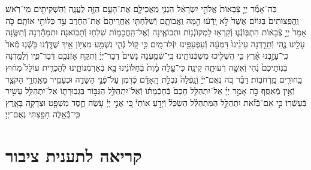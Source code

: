 \documentclass[twoside, openany, parskip=half, 11pt]{book}
\begin{document}
\begin{footnotesize}
\begin{multicols}{2}
כֹּֽה־אָמַ֞ר יְיָ֤ צְֿבָאוֹת֙ אֱלֹהֵ֣י יִשְׂרָאֵ֔ל הִנְנִ֧י מַֽאֲכִילָ֛ם אֶת־הָעָ֥ם הַזֶּ֖ה לַֽעֲנָ֑ה וְֿהִשְׁקִיתִ֖ים מֵי־רֹֽאשׁ׃ וַֽהֲפִֽצוֹתִים֙ בַּגּוֹיִ֔ם אֲשֶׁר֙ לֹ֣א יָֽדְֿע֔וּ הֵ֖מָּה וַֽאֲבוֹתָ֑ם וְֿשִׁלַּחְתִּ֤י אַֽחֲרֵיהֶם֙ אֶת־הַחֶ֔רֶב עַ֥ד כַּלּוֹתִ֖י אוֹתָֽם׃ כֹּ֤ה אָמַר֙ יְיָ֣ צְֿבָא֔וֹת הִתְבּֽוֹנְֿנ֛וּ וְֿקִרְא֥וּ לַמְקוֹנְֿנ֖וֹת וּתְבוֹאֶ֑ינָה וְֿאֶל־הַֽחֲכָמ֥וֹת שִׁלְח֖וּ וְֿתָבֽוֹאנָה׃ וּתְמַהֵ֕רְנָה וְֿתִשֶּׂ֥נָה עָלֵ֖ינוּ נֶ֑הִי וְֿתֵרַ֤דְנָה עֵינֵ֨ינוּ֙ דִּמְעָ֔ה וְֿעַפְעַפֵּ֖ינוּ יִזְּֿלוּ־מָֽיִם׃ כִּ֣י ק֥וֹל נְֿהִ֛י נִשְׁמַ֥ע מִצִּיּ֖וֹן אֵ֣יךְ שֻׁדָּ֑דְֿנוּ בֹּ֤שְֿׁנֽוּ מְֿאֹד֙ כִּֽי־עָזַ֣בְנוּ אָ֔רֶץ כִּ֥י הִשְׁלִ֖יכוּ מִשְׁכְּֿנוֹתֵֽינוּ׃ כִּֽי־שְֿֿׁמַ֤עְנָה נָשִׁים֙ דְּבַר־יְיָ֔ וְֿתִקַּ֥ח אָזְֿנְֿכֶ֖ם דְּֿבַר־פִּ֑יו וְֿלַמֵּ֤דְֿנָה בְֿנֽוֹתֵיכֶם֙ נֶ֔הִי וְֿאִשָּׁ֥ה רְֿעוּתָ֖הּ קִינָֽה׃ כִּי־עָ֤לָה מָ֨וֶת֙ בְּֿחַלּוֹנֵ֔ינוּ בָּ֖א בְּֿאַרְמְֿנוֹתֵ֑ינוּ לְֿהַכְרִ֤ית עוֹלָל֙ מִח֔וּץ בַּֽחוּרִ֖ים מֵֽרְֿחֹבֽוֹת׃ דַּבֵּ֗ר כֹּ֚ה נְאֻם־יְיָ֔ וְֿנָֽפְֿלָה֙ נִבְלַ֣ת הָֽאָדָ֔ם כְּֿדֹ֖מֶן עַל־פְּֿֿנֵ֣י הַשָּׂדֶ֑ה וּכְעָמִ֛יר מֵאַֽחֲרֵ֥י הַקֹּצֵ֖ר וְֿאֵ֥ין מְֿאַסֵּֽף׃ כֹּ֣ה אָמַ֣ר יְיָ֗ אַל־יִתְהַלֵּ֤ל חָכָם֙ בְּֿחָכְֿמָת֔וֹ וְֿאַל־יִתְהַלֵּ֥ל הַגִּבּ֖וֹר בִּגְבֽוּרָת֑וֹ אַל־יִתְהַלֵּ֥ל עָשִׁ֖יר בְּֿעָשְֿׁרֽוֹ׃ כִּ֣י אִם־בְּֿֿזֹ֞את יִתְהַלֵּ֣ל הַמִּתְהַלֵּ֗ל הַשְׂכֵּל֘ וְֿיָדֹ֣עַ אוֹתִי֒ כִּ֚י אֲנִ֣י יְיָ֔ עֹ֥שֶׂה חֶ֛סֶד מִשְׁפָּ֥ט וּצְדָקָ֖ה בָּאָ֑רֶץ כִּֽי־בְֿֿאֵ֥לֶּה חָפַ֖צְתִּי נְאֻם־יְיָ׃

\end{multicols}

\section[תענית ציבור]{קריאה לתענית ציבור}\label{torah taanis tzibbur}



\end{footnotesize}
\end{document}

